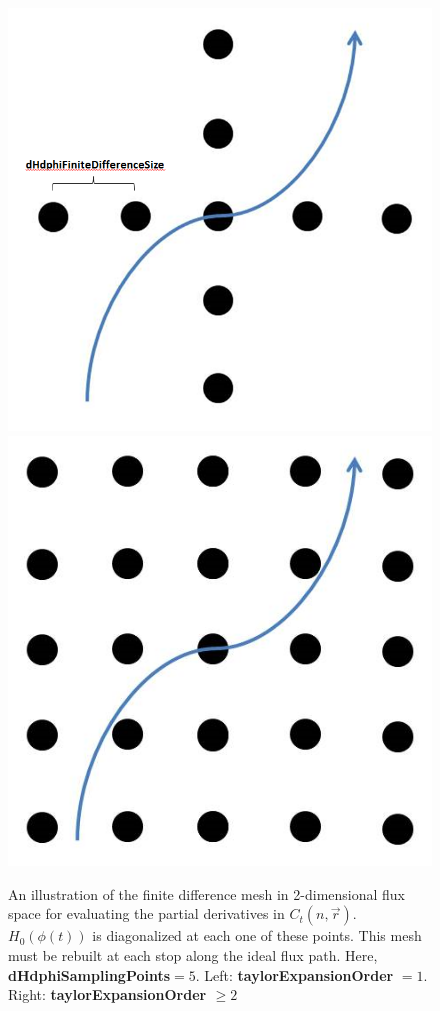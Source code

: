 \documentclass[12pt]{article}
\begin{document}
\begin{figure}
\centering
\includegraphics[scale=0.45]{TELow.png} 
\quad \quad \quad \quad
\includegraphics[scale=0.6]{TEHigh.png}
\label{DiffBetTO1amdTOHigh}
\caption{An illustration of the finite difference mesh in 2-dimensional flux space for evaluating the partial derivatives in $C_t(n,\vec{r})$. $H_0(\phi(t))$ is diagonalized at each one of these points. This mesh must be rebuilt at each stop along the ideal flux path. Here, \textbf{dHdphiSamplingPoints}$=5$. \newline Left: \textbf{taylorExpansionOrder} $= 1$. Right: \textbf{taylorExpansionOrder $\geq 2$}}
\end{figure}
\end{document}
